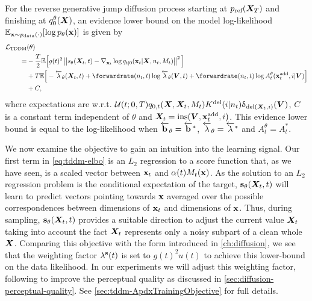 \begin{proposition}
\label{prop:elbo}
For the reverse generative jump diffusion process starting at $p_{\textup{ref}}({\bm{X}}_T)$ and finishing at $ q_0^\theta({\bm{X}})$, an evidence lower bound on the model log-likelihood $ \mathbb{E}_{{\mathbf{x}} \sim p_{\rm{data}}(\cdot)} [ \log p_\theta({\mathbf{x}}) ]$ is given by
\begin{align}
    \label{eq:tddm-elbo}
    \gL_\text{TDDM}&(\theta) \\ 
    = &-\frac{T}{2} \mathbb{E}\Big[ g(t)^2 \norm{s_\theta(\mX_t, t) - \nabla_{\rvx_t} \log q_{t|0}(\rvx_t | \mX, n_t, M_t)   }^2 \Big] \nonumber\\
    &+ T \mathbb{E} \Big[ - \backwardrate_\theta(\mX_t, t) + \forwardrate (n_t, t) \log \backwardrate_\theta(\mV, t) + \forwardrate(n_t, t) \log \autonet_{t}^\theta(\xadd_t, i | \mV) \Big] \nonumber\\
    & + C, \nonumber
\end{align}
where expectations are w.r.t. $\mathcal{U}(t; 0, T) q_{0,t}({\bm{X}}, {\bm{X}}_t, M_t) K^{\textup{del}}(i | n_t) \updelta_{\textup{del}({\bm{X}}_t, i)} ({\bm{V}})$, $C$ is a constant term independent of $\theta$ and ${\bm{X}}_t = \text{ins}({\bm{V}}, {\mathbf{x}}^{\textup{add}}_t, i)$.
This evidence lower bound is equal to the log-likelihood when $\overleftarrow{\mathbf{b}}_\theta = \overleftarrow{\mathbf{b}}^*$, $\overleftarrow{\lambda}_\theta = \overleftarrow{\lambda}^*$ and $A_t^\theta = A_t^*$.
\end{proposition}

We now examine the objective to gain an intuition into the learning signal.
Our first term in \cref{eq:tddm-elbo} is an $L_2$ regression to a score function that, as we have seen, is a scaled vector between ${\mathbf{x}}_t$ and $\alpha(t) M_t({\mathbf{x}})$. As the solution to an $L_2$ regression problem is the conditional expectation of the target, ${\mathbf{s}}_\theta({\bm{X}}_t, t)$ will learn to predict vectors pointing towards ${\mathbf{x}}$ averaged over the possible correspondences between dimensions of ${\mathbf{x}}_t$ and dimensions of ${\mathbf{x}}$.
Thus, during sampling, ${\mathbf{s}}_\theta({\bm{X}}_t, t)$ provides a suitable direction to adjust the current value ${\bm{X}}_t$ taking into account the fact ${\bm{X}}_t$ represents only a noisy subpart of a clean whole ${\bm{X}}$. Comparing this objective with the form introduced in \cref{ch:diffusion}, we see that the weighting factor $\lambda^{\mathbf{s}}(t)$ is set to $g(t)^2 u(t)$ to achieve this lower-bound on the data likelihood. In our experiments we will adjust this weighting factor, following \citet{song2020score} to improve the perceptual quality as discussed in \cref{sec:diffusion-perceptual-quality}. See \cref{sec:tddm-ApdxTrainingObjective} for full details.

